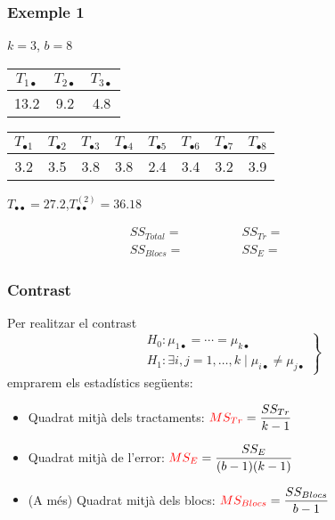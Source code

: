 \documentclass[12pt,t]{beamer}
\newcommand{\red}[1]{\textcolor{red}{#1}}
\theoremstyle{plain}
\theoremstyle{definition}
\begin{document}
\begin{frame}
\frametitle{Exemple 1}
\vspace*{-2ex}


\begin{center}
$k=3$, $b=8$
\bigskip

\begin{tabular}{c|c|c}
${T_{1\bullet}}$ & ${T_{2\bullet}}$ & ${T_{3\bullet}}$  \\
\hline
13.2  & 9.2  & 4.8
\end{tabular}
\bigskip

\begin{tabular}{c|c|c|c|c|c|c|c}
${T_{\bullet1}}$ & ${T_{\bullet2}}$ & ${T_{\bullet3}}$ & ${T_{\bullet4}}$ & ${T_{\bullet5}}$ & ${T_{\bullet6}}$ & ${T_{\bullet7}}$ & ${T_{\bullet8}}$  \\
\hline
3.2 & 3.5 &  3.8 &  3.8 &  2.4 &  3.4 &  3.2 &  3.9
\end{tabular}
\bigskip


$T_{\bullet\bullet}=27.2$,\quad  $T^{(2)}_{\bullet\bullet}=36.18$

\end{center}

$$
\begin{array}{ll}
SS_{Total}=\qquad\qquad & SS_{Tr}=\qquad\qquad {}\\[3ex]

SS_{Blocs}= & SS_E=
\end{array}
$$

\end{frame}




\begin{frame}
\frametitle{Contrast}

Per realitzar  el contrast 
$$
\left.
\begin{array}{l}
H_0 :  \mu_{1\bullet}=\cdots =\mu_{k\bullet} \\
H_1 : \exists i,j=1,\ldots ,k\mid  \mu_{i\bullet}
\neq \mu_{j\bullet}
\end{array}
\right\}
$$
emprarem els  estadístics següents:
\begin{itemize}
\item Quadrat mitjà dels tractaments: $\red{MS_{Tr}}=\dfrac{SS_{Tr}}{k-1}$
\medskip

\item Quadrat mitjà de l'error: $\red{MS_E} = \dfrac{SS_E}{(b-1) (k-1)}$
\medskip

\item (A més) Quadrat mitjà dels blocs:
$\red{MS_{Blocs}}=\dfrac{SS_{Blocs}}{b-1}$
\end{itemize}
\end{frame}
\end{document}
